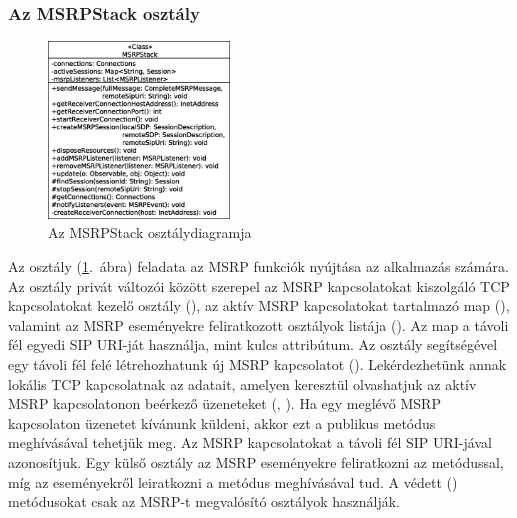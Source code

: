 \subsubsection*{Az MSRPStack osztály}
\label{sec:msrp_stack}

\begin{figure}
  \vspace{-15pt}
  \begin{center}
    \includegraphics[width=0.43\textwidth]{img/class_diagrams/MSRPStack.eps}
  \end{center}
  \vspace{-15pt}
  \captionsetup{font=scriptsize}
  \caption{Az MSRPStack osztálydiagramja}
  \label{fig:class_msrp_stack}
  \vspace{-10pt}
\end{figure}
Az  osztály (\ref{fig:class_msrp_stack}.~ábra) feladata az MSRP funkciók nyújtása az alkalmazás számára. Az osztály privát változói között szerepel az MSRP kapcsolatokat kiszolgáló TCP kapcsolatokat kezelő osztály (), az aktív MSRP kapcsolatokat tartalmazó map (), valamint az MSRP eseményekre feliratkozott osztályok listája (). Az  map a távoli fél egyedi SIP URI-ját használja, mint kulcs attribútum. Az osztály segítségével egy távoli fél felé létrehozhatunk új MSRP kapcsolatot (). Lekérdezhetünk annak lokális TCP kapcsolatnak az adatait, amelyen keresztül olvashatjuk az aktív MSRP kapcsolatonon beérkező üzeneteket (, ). Ha egy meglévő MSRP kapcsolaton üzenetet kívánunk küldeni, akkor ezt a  publikus metódus meghívásával tehetjük meg. Az MSRP kapcsolatokat a távoli fél SIP URI-jával azonosítjuk. Egy külső osztály az MSRP eseményekre feliratkozni az  metódussal, míg az eseményekről leiratkozni a  metódus meghívásával tud. A védett () metódusokat csak az MSRP-t megvalósító osztályok használják.

